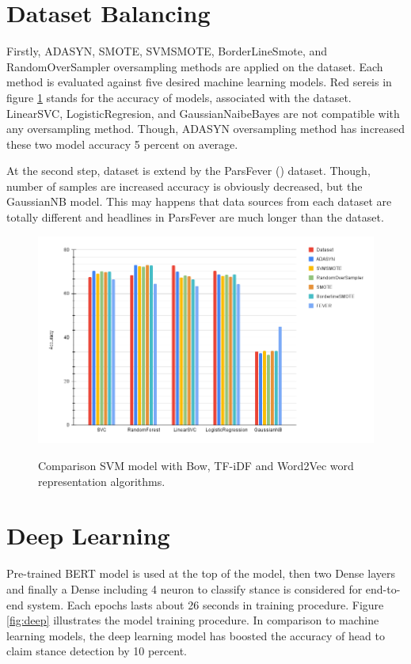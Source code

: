 \section{Dataset Balancing}
Firstly, ADASYN, SMOTE, SVMSMOTE, BorderLineSmote, and RandomOverSampler oversampling methods are applied on the \cite{stance_persian} dataset. Each method is evaluated against five desired machine learning models. Red sereis in figure \ref{fig:balanc} stands for the accuracy of models, associated with the \cite{stance_persian} dataset. LinearSVC, LogisticRegresion, and GaussianNaibeBayes are not compatible with any oversampling method. Though, ADASYN oversampling method has increased these two model accuracy 5 percent on average. 

At the second step, dataset is extend by the ParsFever (\cite{parsfever}) dataset. Though, number of samples are increased accuracy is obviously decreased, but the GaussianNB model. This may happens that data sources from each dataset are totally different and headlines in ParsFever are much longer than the \cite{stance_persian} dataset.
\begin{figure}%
	\centering
	{\includegraphics[width=14.5cm]{statistics/balancing.png} }
	\caption{Comparison SVM model with Bow, TF-iDF and Word2Vec word representation algorithms.}%
	\label{fig:balanc}%
\end{figure}

\section{Deep Learning}
\label{sec:dl}
Pre-trained BERT model is used at the top of the model, then two Dense layers and finally a Dense including 4 neuron to classify stance is considered for end-to-end system. Each epochs lasts about 26 seconds in training procedure. Figure \ref{fig:deep} illustrates the model training procedure. In comparison to machine learning models, the deep learning model has boosted the accuracy of head to claim stance detection by 10 percent. 

